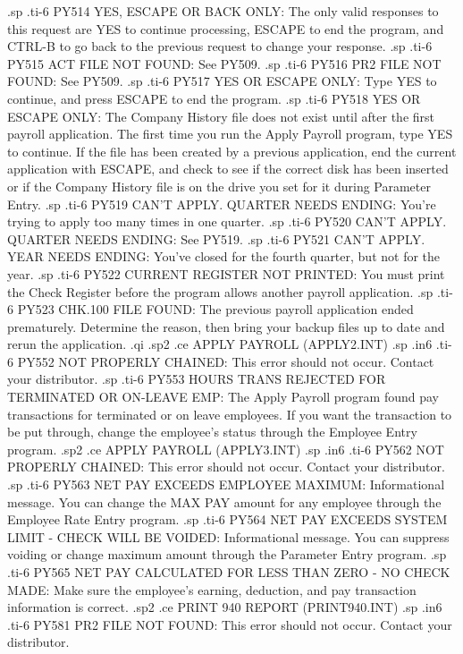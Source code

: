 .sp
.ti-6
PY514 YES, ESCAPE OR BACK ONLY: The only valid responses to this request
are YES to continue processing, ESCAPE to end the program, and CTRL-B
to go back to the previous request to change your response.
.sp
.ti-6
PY515 ACT FILE NOT FOUND: See PY509.
.sp
.ti-6
PY516 PR2 FILE NOT FOUND: See PY509.
.sp
.ti-6
PY517 YES OR ESCAPE ONLY: Type YES to continue, and press ESCAPE to end the
program.
.sp
.ti-6
PY518 YES OR ESCAPE ONLY: The Company History file does not exist until
after the first payroll application.  The first time you run the Apply
Payroll program, type YES to continue.	If the file has been created by
a previous application, end the current application with ESCAPE, and
check to see if the correct disk has been inserted or if the Company
History file is on the drive you set for it during Parameter Entry.
.sp
.ti-6
PY519 CAN'T APPLY.  QUARTER NEEDS ENDING: You're trying to apply too
many times in one quarter.
.sp
.ti-6
PY520 CAN'T APPLY.  QUARTER NEEDS ENDING: See PY519.
.sp
.ti-6
PY521 CAN'T APPLY.  YEAR NEEDS ENDING: You've closed for the fourth
quarter, but not for the year.
.sp
.ti-6
PY522 CURRENT REGISTER NOT PRINTED: You must print the Check Register
before the program allows another payroll application.
.sp
.ti-6
PY523 CHK.100 FILE FOUND: The previous payroll application ended prematurely.
Determine the reason, then bring your backup files up to date and
rerun the application.
.qi
.sp2
.ce
APPLY PAYROLL (APPLY2.INT)
.sp
.in6
.ti-6
PY552 NOT PROPERLY CHAINED: This error should not occur. Contact your
distributor.
.sp
.ti-6
PY553 HOURS TRANS REJECTED FOR TERMINATED OR ON-LEAVE EMP:  The Apply
Payroll program found pay transactions for terminated or on leave employees.
If you want the transaction to be put through, change the employee's status
through the Employee Entry program.
.sp2
.ce
APPLY PAYROLL  (APPLY3.INT)
.sp
.in6
.ti-6
PY562 NOT PROPERLY CHAINED: This error should not occur.  Contact your
distributor.
.sp
.ti-6
PY563 NET PAY EXCEEDS EMPLOYEE MAXIMUM: Informational message. You can
change the MAX PAY amount for any employee through the Employee Rate
Entry program.
.sp
.ti-6
PY564 NET PAY EXCEEDS SYSTEM LIMIT - CHECK WILL BE VOIDED: Informational
message. You can suppress voiding or change maximum amount through the
Parameter Entry program.
.sp
.ti-6
PY565 NET PAY CALCULATED FOR LESS THAN ZERO - NO CHECK MADE: Make sure
the employee's earning, deduction, and pay transaction information is
correct.
.sp2
.ce
PRINT 940 REPORT (PRINT940.INT)
.sp
.in6
.ti-6
PY581 PR2 FILE NOT FOUND: This error should not occur.	Contact your
distributor.
